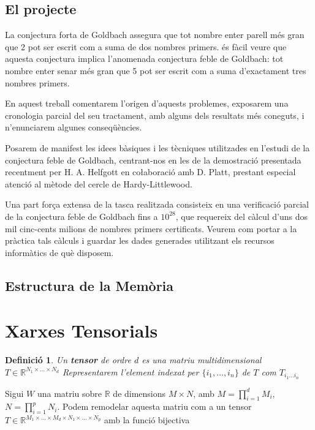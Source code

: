 \documentclass[11pt,a4paper,openright,oneside]{article}
\numberwithin{equation}{section}
\newtheorem{defi}[teo]{Definici\'o}
\theoremstyle{definition}
\begin{document}
\subsection*{El projecte}

La conjectura forta de Goldbach assegura que tot nombre enter parell m\' es gran que 2 pot ser escrit com a suma de dos nombres primers. \'es f\`acil veure que aquesta conjectura implica l'anomenada conjectura feble de Goldbach: tot nombre enter senar m\'es gran que 5 pot ser escrit com a suma d'exactament tres nombres primers.

En aquest treball comentarem l'origen d'aquests problemes, exposarem una cro\-no\-lo\-gia parcial del seu tractament, amb alguns dels resultats m\'es coneguts, i n'enunciarem algunes conseq\"u\`encies.

Posarem de manifest les idees b\`asiques i les t\`ecniques utilitzades en l'estudi de la conjectura feble de Goldbach, centrant-nos en les de la demostraci\'o presentada recentment per H. A. Helfgott en co{\l}aboraci\'o amb D. Platt, prestant especial atenci\'o al m\`etode del cercle de Hardy-Littlewood.

Una part for\c{c}a extensa de la tasca realitzada consisteix en una verificaci\'o parcial de la conjectura feble de Goldbach fins a $10^{28}$, que requereix del c\`alcul d'uns dos mil cinc-cents milions de nombres primers certificats. Veurem com portar a la pr\`actica tals c\`alculs i guardar les dades generades utilitzant els recursos inform\`atics de qu\`e disposem.


\subsection*{Estructura de la Mem\`oria}

\newpage


\section{Xarxes Tensorials}



\begin{defi}
 Un \textbf{tensor} de ordre $d$ es una matriu multidimensional $T \in \mathbb{R}^{N_1 \times \dots \times N_d}$ 
Representarem l'element indexat per $\{i_1, \dots, i_n\}$ de $T$ com $T_{i_1 \dots i_n}$
\end{defi}

\noindent Sigui $W$ una matriu sobre $\mathbb{R}$ de dimensions $M \times N$, amb $M = \prod_{i=1}^d M_i$, $N = \prod_{i=1}^p N_i$. Podem
remodelar aquesta matriu com a un tensor $T \in \mathbb{R}^{M_1 \times \dots \times M_d \times N_1 \times \dots \times N_p}$ amb la funció bijectiva
\end{document}
